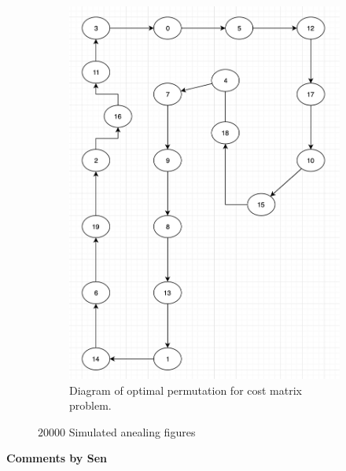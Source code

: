 \begin{figure}[H]
\begin{subfigure}[H]{0.475\textwidth}
            \includegraphics[width=\textwidth]{figures/matrix.png}
            \caption[]%
            {{\small Diagram of optimal permutation for cost matrix problem.}}    
            \label{fig:stuff}
        \end{subfigure}
        \caption[ The average and standard deviation of critical parameters ]
        {\small $20000$ Simulated anealing figures } 
        \label{fig:ex71}
    \end{figure}

\textbf{Comments by Sen}


